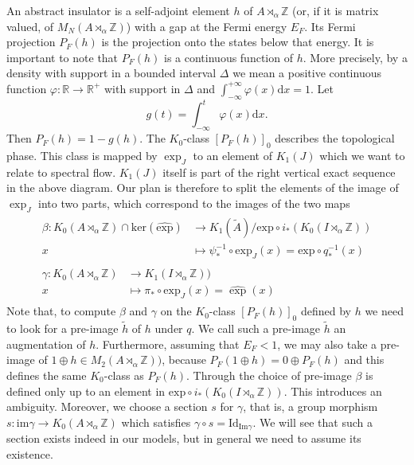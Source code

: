 \documentclass[11pt]{amsart}
\newcommand{\R}{\mathbb{R}}
\newcommand{\Z}{\mathbb{Z}}
\renewcommand{\b}{\psi}
\begin{document}
An abstract insulator is a self-adjoint element $h$ of $A\rtimes_\alpha\Z$ (or, if it is matrix valued, of $M_N(A\rtimes_\alpha\Z)$) with a gap at the Fermi energy $E_F$. Its Fermi projection $P_F(h)$ is the projection onto the states below that energy. It is important to note that $P_F(h)$ is a continuous function of $h$. More precisely, by  
a density with support in a bounded interval $\Delta$ we mean a positive continuous function $\varphi:\R\to \R^+$ with support in $\Delta$ and $\int_{-\infty}^{+\infty}\varphi(x) \mathrm{d} x = 1$. Let
\begin{equation}\label{eq-g}
   g(t)=\int_{-\infty}^t\varphi(x)\mathrm{d}x.
\end{equation}   
Then $P_F(h) = 1 - g(h)$. 
The $K_0$-class $[P_F(h)]_0$ describes the topological phase. This class is mapped  
by $\exp_J$ to an element of $K_1(J)$ which we want to relate to spectral flow. $K_1(J)$ itself is part of the right vertical exact sequence in the above diagram.
Our plan is therefore to split the elements of the image of $\exp_J$ into two parts, which correspond to the images of the two maps
\begin{align}\label{beta}
	\begin{split}
		\beta:K_0(A \rtimes_\alpha \mathbb{Z}) \cap \mathrm{ker}(\hat{\mathrm{exp}}) & \rightarrow K_1(\tilde{A})/\mathrm{exp}\circ i_*(K_0(I \rtimes_\alpha \mathbb{Z}))\\
		x &\mapsto \b_*^{-1}\circ \mathrm{exp}_J(x)=\mathrm{exp}\circ q_*^{-1}(x) 
	\end{split} \\
	\begin{split}
		\gamma:K_0(A \rtimes_\alpha \mathbb{Z})  & \rightarrow K_1(I \rtimes_\alpha \mathbb{Z}))\\
		x&\mapsto \pi_*\circ \mathrm{exp}_J(x)=\hat \exp (x) 
	\end{split}
\end{align}
Note that, to compute $\beta$ and $\gamma$ on the $K_0$-class $[P_F(h)]_0$ defined by $h$ we need to look for a pre-image $\tilde h$ of $h$ under $q$. We call such a pre-image $\tilde h$ an augmentation of $h$. Furthermore, assuming that $E_F<1$, we may also take a pre-image of $1\oplus h \in M_2(A\rtimes_\alpha\Z))$, because $P_F(1\oplus h) = 0 \oplus P_F(h)$ and this defines the same $K_0$-class as $P_F(h)$. Through the choice of pre-image $\beta$ is defined only up to an element in $\mathrm{exp}\circ i_*(K_0(I \rtimes_\alpha \mathbb{Z}))$. This introduces an ambiguity. 
Moreover, we choose a section $s$ for $\gamma$, that is, a group morphism $s:\mathrm{im}\gamma\to K_0(A \rtimes_\alpha \mathbb{Z})$
which satisfies $\gamma\circ s=\mathrm{Id}_{\mathrm{Im}\gamma}$. We will see that such a section exists indeed in our models, but in general we need to assume its existence. 
\end{document}

